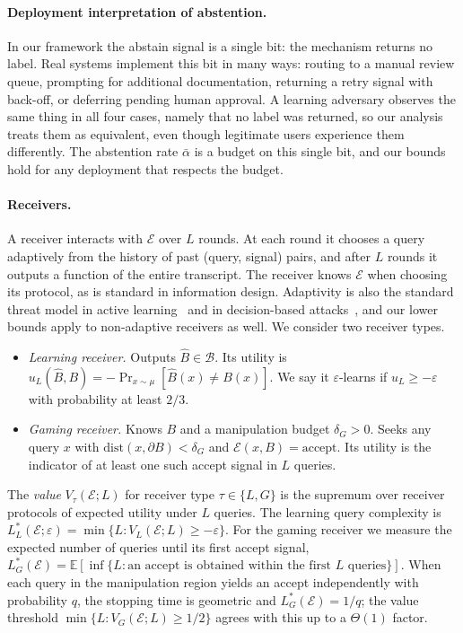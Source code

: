 \documentclass[runningheads,envcountsame]{llncs}
\newcommand{\cB}{\mathcal{B}}
\newcommand{\cE}{\mathcal{E}}
\newcommand{\E}{\mathbb{E}}
\newcommand{\eps}{\varepsilon}
\begin{document}
\paragraph{Deployment interpretation of abstention.} In our framework the abstain signal is a single bit: the mechanism returns no label. Real systems implement this bit in many ways: routing to a manual review queue, prompting for additional documentation, returning a retry signal with back-off, or deferring pending human approval. A learning adversary observes the same thing in all four cases, namely that no label was returned, so our analysis treats them as equivalent, even though legitimate users experience them differently. The abstention rate $\bar\alpha$ is a budget on this single bit, and our bounds hold for any deployment that respects the budget.

\paragraph{Receivers.}
A receiver interacts with $\cE$ over $L$ rounds. At each round it chooses a query adaptively from the history of past (query, signal) pairs, and after $L$ rounds it outputs a function of the entire transcript. The receiver knows $\cE$ when choosing its protocol, as is standard in information design. Adaptivity is also the standard threat model in active learning~\cite{hanneke2014theory} and in decision-based attacks~\cite{brendel2018decision,chen2020hopskipjump}, and our lower bounds apply to non-adaptive receivers as well. We consider two receiver types.
\begin{itemize}[nosep]
\item \emph{Learning receiver.} Outputs $\hat B \in \cB$. Its utility is $u_L(\hat B, B) = -\Pr_{x \sim \mu}[\hat B(x) \neq B(x)]$. We say it $\eps$-learns if $u_L \geq -\eps$ with probability at least $2/3$.
\item \emph{Gaming receiver.} Knows $B$ and a manipulation budget $\delta_G > 0$. Seeks any query $x$ with $\mathrm{dist}(x, \partial B) < \delta_G$ and $\cE(x, B) = \text{accept}$. Its utility is the indicator of at least one such accept signal in $L$ queries.
\end{itemize}
The \emph{value} $V_\tau(\cE; L)$ for receiver type $\tau \in \{L, G\}$ is the supremum over receiver protocols of expected utility under $L$ queries. The learning query complexity is $L^*_L(\cE; \eps) = \min\{L : V_L(\cE; L) \geq -\eps\}$. For the gaming receiver we measure the expected number of queries until its first accept signal, $L^*_G(\cE) = \E[\inf\{L : \text{an accept is obtained within the first } L \text{ queries}\}]$. When each query in the manipulation region yields an accept independently with probability $q$, the stopping time is geometric and $L^*_G(\cE) = 1/q$; the value threshold $\min\{L : V_G(\cE; L) \geq 1/2\}$ agrees with this up to a $\Theta(1)$ factor.
\end{document}
